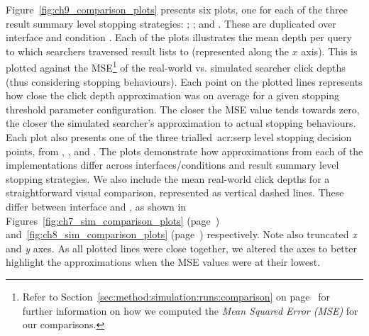 Figure~\ref{fig:ch9_comparison_plots} presents six plots, one for each of the three result summary level stopping strategies: ; ; and . These are duplicated over interface  and condition . Each of the plots illustrates the mean depth per query to which searchers traversed result lists to (represented along the $x$ axis). This is plotted against the MSE\footnote{Refer to Section~\ref{sec:method:simulation:runs:comparison} on page~\pageref{sec:method:simulation:runs:comparison} for further information on how we computed the \emph{Mean Squared Error (MSE)} for our comparisons.} of the real-world vs. simulated searcher click depths (thus considering stopping behaviours). Each point on the plotted lines represents how close the click depth approximation was on average for a given stopping threshold parameter configuration. The closer the MSE value tends towards zero, the closer the simulated searcher's approximation to actual stopping behaviours. Each plot also presents one of the three trialled~\gls{acr:serp} level stopping decision points, from , , and . The plots demonstrate how approximations from each of the implementations differ across interfaces/conditions and result summary level stopping strategies. We also include the mean real-world click depths for a straightforward visual comparison, represented as vertical dashed lines. These differ between interface  and , as shown in Figures~\ref{fig:ch7_sim_comparison_plots} (page~\pageref{fig:ch7_sim_comparison_plots}) and~\ref{fig:ch8_sim_comparison_plots} (page~\pageref{fig:ch8_sim_comparison_plots}) respectively. Note also truncated \emph{x} and \emph{y} axes. As all plotted lines were close together, we altered the axes to better highlight the approximations when the MSE values were at their lowest.

